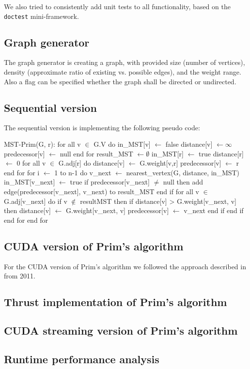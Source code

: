 \documentclass[sigconf,nonacm]{acmart}
\begin{document}
We also tried to consistently add unit tests to all functionality,
based on the \texttt{doctest} mini-framework.

\subsection{Graph generator}

The graph generator is creating a graph, with provided size (number of vertices),
density (approximate ratio of existing vs. possible edges), and the weight range.
Also a flag can be specified whether the graph shall be directed or undirected.

\subsection{Sequential version}

The sequential version is implementing the following pseudo code:
\begin{algorithm}[caption={Sequential Prim}, label={prim:cpu}]
MST-Prim(G, r):
for all v $\in$ G.V do
  in_MST[v] $\gets$ false
  distance[v] $\gets \infty$
  predecessor[v] $\gets$ null
end for
result_MST $\gets \emptyset$
in_MST[r] $\gets$ true
distance[r] $\gets$ 0
for all v $\in$ G.adj[r] do
  distance[v] $\gets$ G.weight[v,r]
  predecessor[v] $\gets$ r
end for
for i $\gets$ 1 to n-1 do
  v_next $\gets$ nearest_vertex(G, distance, in_MST)
  in_MST[v_next] $\gets$ true
  if predecessor[v_next] $\ne$ null then
    add edge(predecessor[v_next], v_next) to result_MST
  end if
  for all v $\in$ G.adj[v_next] do
    if v $\notin$ resultMST then
      if distance[v] > G.weight[v_next, v] then
        distance[v] $\gets$ G.weight[v_next, v]
        predecessor[v] $\gets$ v_next
      end if
    end if
  end for
end for
\end{algorithm}

\subsection{CUDA version of Prim's algorithm}

For the CUDA version of Prim's algorithm we followed the approach described in \cite{wang2011design} from 2011.

\subsection{Thrust implementation of Prim's algorithm}
\subsection{CUDA streaming version of Prim's algorithm}
\subsection{Runtime performance analysis}



\end{document}
